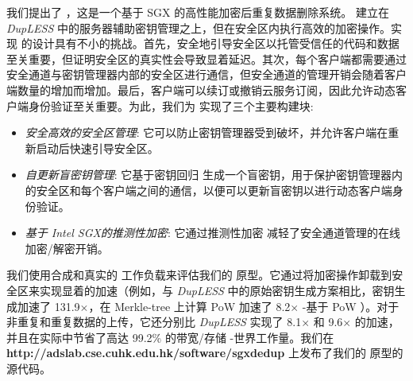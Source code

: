 我们提出了 \sysnameS，这是一个基于 SGX 的高性能加密后重复数据删除系统。 \sysnameS 建立在 {\em DupLESS} \cite{bellare2013DupLESS} 中的服务器辅助密钥管理之上，但在安全区内执行高效的加密操作。实现 \sysnameS 的设计具有不小的挑战。首先，安全地引导安全区以托管受信任的代码和数据至关重要，但证明安全区的真实性会导致显着延迟。其次，每个客户端都需要通过安全通道与密钥管理器内部的安全区进行通信，但安全通道的管理开销会随着客户端数量的增加而增加。最后，客户端可以续订或撤销云服务订阅，因此允许动态客户端身份验证至关重要。为此，我们为 \sysnameS 实现了三个主要构建块: 

\begin{itemize}[leftmargin=*]
    \item \textit{安全高效的安全区管理}:
        它可以防止密钥管理器受到破坏，并允许客户端在重新启动后快速引导安全区。
    \item \textit{自更新盲密钥管理}:
        它基于密钥回归 \cite{fu06} 生成一个盲密钥，用于保护密钥管理器内的安全区和每个客户端之间的通信，以便可以更新盲密钥以进行动态客户端身份验证。
    \item \textit{基于 Intel SGX的推测性加密}:
        它通过推测性加密 \cite{eduardo19} 减轻了安全通道管理的在线加密/解密开销。
\end{itemize}

我们使用合成和真实的 \cite{fsl,meyer11} 工作负载来评估我们的 \sysnameS 原型。它通过将加密操作卸载到安全区来实现显着的加速（例如，与 {\em DupLESS} \cite{bellare2013DupLESS} 中的原始密钥生成方案相比，密钥生成加速了 131.9$\times$，在 Merkle-tree 上计算 PoW 加速了 8.2$\times$ -基于 PoW \cite{halevi11}）。对于非重复和重复数据的上传，它还分别比 {\em DupLESS} \cite{bellare2013DupLESS} 实现了 8.1$\times$ 和 9.6$\times$ 的加速，并且在实际中节省了高达 99.2\% 的带宽/存储 -世界工作量。我们在 {\bf http://adslab.cse.cuhk.edu.hk/software/sgxdedup} 上发布了我们的 \sysnameS 原型的源代码。 

